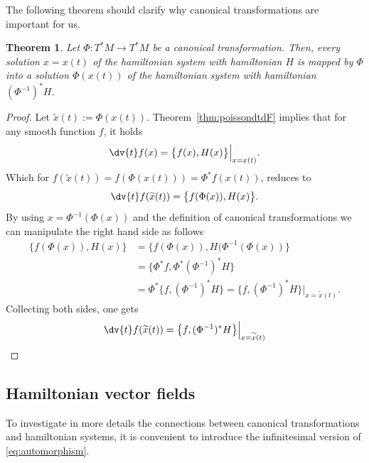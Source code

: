 \documentclass[english,fontsize=11pt,paper=b5]{scrbook}
\numberwithin{equation}{chapter}
\newtheorem{theorem}{Theorem}[chapter]
\theoremstyle{definition}
\begin{document}
    The following theorem should clarify why canonical transformations are important for us.
    \begin{theorem}\label{thm:canonicalmapping}
      Let $\Phi: T^*M \to T^* M$ be a canonical transformation.
      Then, every solution $x = x(t)$ of the hamiltonian system with hamiltonian $H$ is mapped by $\Phi$ into a solution $\Phi(x(t))$ of the hamiltonian system with hamiltonian $(\Phi^{-1})^* H$.
    \end{theorem}
    \begin{proof}
      Let $\widetilde x(t) := \Phi(x(t))$. Theorem~\ref{thm:poissondtdF} implies that for any smooth function $f$, it holds
      \begin{equation}
        \dv{t} f(x) = \big\{f(x), H(x)\big\}\Big|_{x=x(t)}.
      \end{equation}
      Which for $f(\widetilde x(t)) = f(\Phi(x(t))) = \Phi^* f(x(t))$, reduces to
      \begin{equation}
        \dv{t} f(\widetilde x(t)) = \big\{f(\Phi(x)), H(x)\big\}.
      \end{equation}
      By using $x = \Phi^{-1}(\Phi(x))$ and the definition of canonical transformations we can manipulate the right hand side as follows
      \begin{align}
        \big\{f(\Phi(x)), H(x)\big\} & = \big\{f(\Phi(x)), H(\Phi^{-1}(\Phi(x))\big\}                                                     \\
                                     & = \big\{\Phi^* f, \Phi^* (\Phi^{-1})^* H\big\}                                                     \\
                                     & = \Phi^* \big\{f, (\Phi^{-1})^* H\big\} = \big\{f, (\Phi^{-1})^* H\big\}\Big|_{x=\widetilde x(t)}.
      \end{align}
      Collecting both sides, one gets
      \begin{equation}
        \dv{t} f(\widetilde x(t)) = \big\{f, (\Phi^{-1})^* H\big\}\Big|_{x=\widetilde x(t)}
      \end{equation}
    \end{proof}

    \subsection{Hamiltonian vector fields}

    To investigate in more details the connections between canonical transformations and hamiltonian systems, it is convenient to introduce the infinitesimal version of \eqref{eq:automorphism}.
\end{document}
